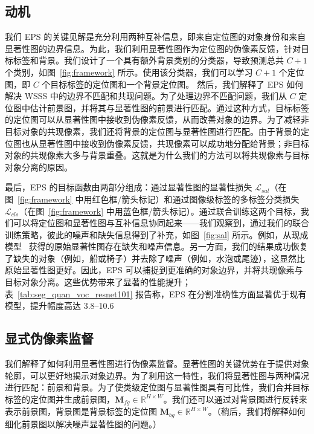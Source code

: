 \documentclass[final]{cvpr}
\begin{document}
\subsection{动机}
\label{section3.1}

我们 EPS 的关键见解是充分利用两种互补信息，即来自定位图的对象身份和来自显著性图的边界信息。为此，我们利用显著性图作为定位图的伪像素反馈，针对目标标签和背景。我们设计了一个具有额外背景类别的分类器，导致预测总共 $C+1$ 个类别，如图~\ref{fig:framework} 所示。使用该分类器，我们可以学习 $C+1$ 个定位图，即 $C$ 个目标标签的定位图和一个背景定位图。
然后，我们解释了 EPS 如何解决 WSSS 中的边界不匹配和共现问题。为了处理边界不匹配问题，我们从 $C$ 定位图中估计前景图，并将其与显著性图的前景进行匹配。通过这种方式，目标标签的定位图可以从显著性图中接收到伪像素反馈，从而改善对象的边界。为了减轻非目标对象的共现像素，我们还将背景的定位图与显著性图进行匹配。由于背景的定位图也从显著性图中接收到伪像素反馈，共现像素可以成功地分配给背景；非目标对象的共现像素大多与背景重叠。这就是为什么我们的方法可以将共现像素与目标对象分离的原因。

最后，EPS 的目标函数由两部分组成：通过显著性图的{显著性损失} $
\mathcal{L}_{sal}$（在图~\ref{fig:framework} 中用红色框/箭头标记）和通过图像级标签的{多标签分类损失} $
\mathcal{L}_{cls}$（在图~\ref{fig:framework} 中用蓝色框/箭头标记）。通过联合训练这两个目标，我们可以将定位图和显著性图与互补信息协同起来——我们观察到，通过我们的联合训练策略，彼此的噪声和缺失信息得到了补充，如图~\ref{fig:sal} 所示。例如，从现成模型~\cite{hou2017deeply,nguyen2019deepusps,zhao2019pyramid} 获得的原始显著性图存在缺失和噪声信息。另一方面，我们的结果成功恢复了缺失的对象（例如，船或椅子）并去除了噪声（例如，水泡或尾迹），这显然比原始显著性图更好。因此，EPS 可以捕捉到更准确的对象边界，并将共现像素与目标对象分离。这些优势带来了显著的性能提升；表~\ref{tab:seg_quan_voc_resnet101} 报告称，EPS 在分割准确性方面显著优于现有模型，提升幅度高达 3.8--10.6%

\subsection{显式伪像素监督}\label{section3.2}

我们解释了如何利用显著性图进行伪像素监督。显著性图的关键优势在于提供对象轮廓，可以更好地揭示对象边界。为了利用这一特性，我们将显著性图与两种情况进行匹配：前景和背景。为了使类级定位图与显著性图具有可比性，我们合并目标标签的定位图并生成前景图，$
\mathbf{M}_{fg} \in \mathbb{R}^{H \times W}$。我们还可以通过对背景图进行反转来表示前景图，背景图是背景标签的定位图 $
\mathbf{M}_{bg} \in \mathbb{R}^{H \times W}$。（稍后，我们将解释如何细化前景图以解决噪声显著性图的问题。）
\end{document}
